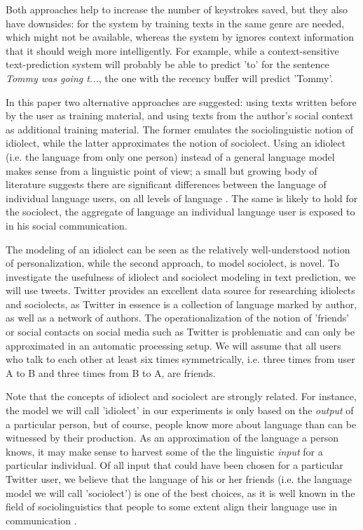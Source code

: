\documentclass[11pt]{article}
\begin{document}
Both approaches help to increase the number of keystrokes saved, but they also have downsides: for the system by  training texts in the same genre are needed, which might not be available, whereas the system by  ignores context information that it should weigh more intelligently. For example, while a context-sensitive text-prediction system will probably be able to predict 'to' for the sentence \emph{Tommy was going t...}, the one with the recency buffer will predict 'Tommy'.

In this paper two alternative approaches are suggested: using texts written before by the user as training material, and using texts from the author's social context as additional training material. The former emulates the sociolinguistic notion of idiolect, while the latter approximates the notion of sociolect. Using an idiolect (i.e. the language from only one person) instead of a general language model makes sense from a linguistic point of view; a small but growing body of literature suggests there are significant differences between the language of individual language users, on all levels of language \cite[among others]{mollin09,barlow10}. The same is likely to hold for the sociolect, the aggregate of language an individual language user is exposed to in his social communication.

The modeling of an idiolect can be seen as the relatively well-understood notion of personalization, while the second approach, to model sociolect, is novel. To investigate the usefulness of idiolect and sociolect modeling in text prediction, we will use tweets. Twitter provides an excellent data source for researching idiolects and sociolects, as Twitter in essence is a collection of language marked by author, as well as a network of authors. The operationalization of the notion of 'friends' or social contacts on social media such as Twitter is problematic and can only be approximated in an automatic processing setup. We will assume that all users who talk to each other at least six times symmetrically, i.e. three times from user A to B and three times from B to A, are friends. 

Note that the concepts of idiolect and sociolect are strongly related. For instance, the model we will call 'idiolect' in our experiments is only based on the \emph{output} of a particular person, but of course, people know more about language than can be witnessed by their production. As an approximation of the language a person knows, it may make sense to harvest some of the the linguistic \emph{input} for a particular individual. Of all input that could have been chosen for a particular Twitter user, we believe that the language of his or her friends (i.e. the language model we will call 'sociolect') is one of the best choices, as it is well known in the field of sociolinguistics that people to some extent align their language use in communication \cite[among others]{meshtrie00}. 
\end{document}
